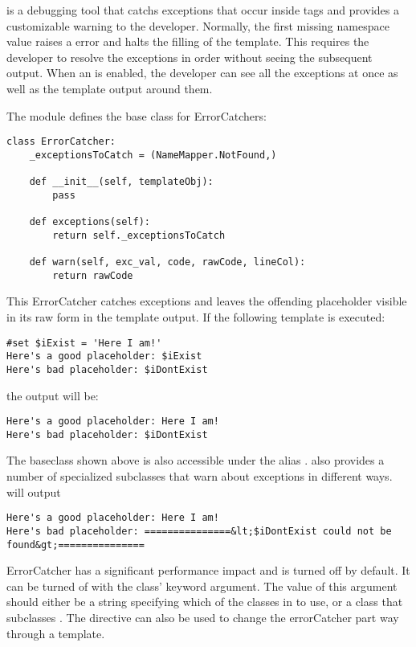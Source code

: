  is a debugging tool that catchs exceptions that occur inside
 tags and provides a customizable warning to the developer.
Normally, the first missing namespace value raises a 
error and halts the filling of the template. This requires the developer to
resolve the exceptions in order without seeing the subsequent output. When an
 is enabled, the developer can see all the exceptions at
once as well as the template output around them.

The  module defines the base class for
ErrorCatchers:

\begin{verbatim}
class ErrorCatcher:
    _exceptionsToCatch = (NameMapper.NotFound,)
    
    def __init__(self, templateObj):
        pass
    
    def exceptions(self):
        return self._exceptionsToCatch
    
    def warn(self, exc_val, code, rawCode, lineCol):
        return rawCode
\end{verbatim}    

This ErrorCatcher catches  exceptions and leaves the
offending placeholder visible in its raw form in the template output.  If the
following template is executed:
\begin{verbatim}
#set $iExist = 'Here I am!'
Here's a good placeholder: $iExist
Here's bad placeholder: $iDontExist
\end{verbatim}    

the output will be:
\begin{verbatim}
Here's a good placeholder: Here I am!
Here's bad placeholder: $iDontExist
\end{verbatim}

The baseclass shown above is also accessible under the alias
.   also provides a
number of specialized subclasses that warn about exceptions in different ways.
 will output

\begin{verbatim}
Here's a good placeholder: Here I am!
Here's bad placeholder: ===============&lt;$iDontExist could not be found&gt;===============
\end{verbatim}

ErrorCatcher has a significant performance impact and is turned off by default.
It can be turned of with the  class' 
keyword argument.  The value of this argument should either be a string
specifying which of the classes in  to use, or a
class that subclasses . The
 directive can also be used to change the errorCatcher part
way through a template.


